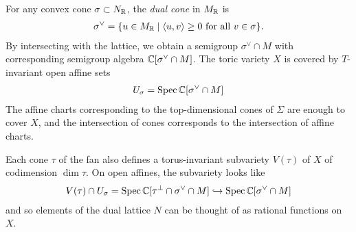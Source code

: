 For any convex cone $\sigma \subset N_{\mathbb{R}}$, the \emph{dual cone} in $M_{\mathbb{R}}$ is \begin{align*}
	\sigma^\vee = \{u\in M_{\mathbb{R}} \mid \langle u,v\rangle \geq 0 \text{ for all } v\in \sigma\}.
\end{align*} By intersecting with the lattice, we obtain a semigroup $\sigma^\vee \cap M$
with corresponding semigroup algebra $\mathbb{C}[\sigma^\vee \cap M]$. The toric variety $X$
is covered by $T$-invariant open affine sets \begin{align*}
	U_\sigma = \operatorname{Spec} \mathbb{C}[\sigma^\vee \cap M]
\end{align*} The affine charts corresponding to the top-dimensional cones of $\Sigma$
are enough to cover $X$, and the intersection of cones corresponds to the intersection of
affine charts.

Each cone $\tau$ of the fan also defines a torus-invariant subvariety $V(\tau)$ of $X$ of codimension $\dim \tau$.
On open affines, the subvariety looks like \begin{align*}
	V(\tau) \cap U_\sigma = \operatorname{Spec} \mathbb{C}[\tau^{\perp} \cap \sigma^\vee \cap M] \hookrightarrow \operatorname{Spec} \mathbb{C}[\sigma^\vee \cap M]
\end{align*} and so elements of the dual lattice $N$ can be thought of as rational functions on $X$.


